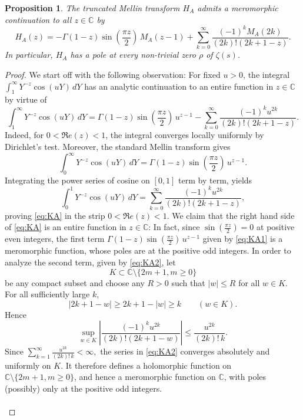 \documentclass[10pt,a4paper]{amsart}
\newtheorem{proposition}{Proposition}
\newcommand{\C}{\mathbb C}
\begin{document}
\begin{proposition}\label{prop:HA}
The truncated Mellin transform $H_A$ admits a meromorphic continuation to all $z\in\C$ by
\begin{equation}\label{eq:HAtrans}
H_A(z) = -\Gamma(1-z)\sin\left(\frac{\pi z}{2}\right)\,M_A(z-1) +
\sum_{k=0}^{\infty}
\frac{(-1)^kM_A(2k)}{(2k)!(2k+1-z)}.
\end{equation}
In particular, $H_A$ has a pole at every non-trivial zero $\rho$ of $\zeta(s)$.
\end{proposition}

\begin{proof}
We start off with the following observation: For fixed $u>0$, the integral $\int_1^\infty Y^{-z}\cos(uY)\,dY$ has an analytic continuation to an entire function in $z\in\C$ by virtue of
\begin{equation}\label{eq:KA}
\int_1^\infty Y^{-z}\cos(uY)\,dY=\Gamma(1-z)\sin\left(\frac{\pi z}{2}\right)\,u^{z-1}-\sum_{k=0}^{\infty}\frac{(-1)^k u^{2k}}{(2k)!(2k+1-z)}.
\end{equation}
Indeed, for $0<\Re e(z)<1$, the integral  converges locally uniformly by Dirichlet's test. Moreover, the standard Mellin transform gives
\begin{equation}\label{eq:KA1}
\int_0^\infty Y^{-z}\cos(uY)\,dY = \Gamma(1-z)\sin\left(\frac{\pi z}{2}\right)\,u^{z-1}.
\end{equation}
Integrating the power series of cosine on $[0,1]$ term by term, yields
\begin{equation}\label{eq:KA2}
\int_0^1Y^{-z}\cos(uY)\,dY= \sum_{k=0}^{\infty}\frac{(-1)^k u^{2k}}{(2k)!(2k+1-z)},
\end{equation}
proving \eqref{eq:KA} in the strip $0<\Re e(z)<1$. We claim that the right hand side of \eqref{eq:KA} is an entire function in $z\in\C$: In fact, since $\sin\left(\frac{\pi z}{2}\right)=0$ at positive even integers, the first term $\Gamma(1-z)\sin\left(\frac{\pi z}{2}\right)\,u^{z-1}$ given by \eqref{eq:KA1} is a meromorphic function, whose poles are at the positive odd integers. In order to analyze the second term, given by \eqref{eq:KA2}, let
$$
K\subset\mathbb C\setminus\{2m+1, m\geq 0\}
$$
be any compact subset and choose any $R>0$ such that $|w|\le R$ for all $w\in K$. For all sufficiently large $k$,
$$
|2k+1-w| \ge 2k+1-|w| \ge k \qquad (w\in K).
$$
Hence
$$
\sup_{w\in K} \left| \frac{(-1)^k u^{2k}}{(2k)!(2k+1-w)}\right|\le\frac{u^{2k}}{(2k)!\,k}.
$$
Since $\sum_{k=1}^{\infty} \frac{u^{2k}}{(2k)!\,k}<\infty,$ the series in \eqref{eq:KA2} converges absolutely and uniformly on $K$.  It therefore defines a holomorphic function on $\mathbb C\setminus\{2m+1, m\geq 0\}$, and hence a meromorphic function on $\mathbb C$, with poles (possibly) only at the positive odd integers.\\\\ 

\end{proof}
\end{document}
